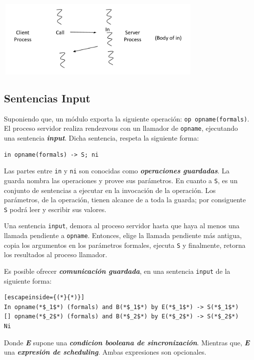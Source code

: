 \documentclass[a4paper, 10pt]{report}
\begin{document}
\centerline{
	\includegraphics[width=4in, height=1.5in]{assets/rendezvous_execution.png}
}

\subsection{Sentencias Input}

Suponiendo que, un módulo exporta la siguiente operación: \lstinline{op opname(formals)}. El proceso servidor realiza rendezvous con un llamador de \lstinline{opname}, ejecutando una sentencia \textbf{\emph{input}}. Dicha sentencia, respeta la siguiente forma:

\begin{lstlisting}
in opname(formals) -> S; ni
\end{lstlisting}

Las partes entre \lstinline{in} y \lstinline{ni} son conocidas como \textbf{\emph{operaciones guardadas}}. La guarda nombra las operaciones y provee sus parámetros.
En cuanto a \lstinline{S}, es un conjunto de sentencias a ejecutar en la invocación de la operación. Los parámetros, de la operación, tienen alcance de a toda la guarda; por consiguente \lstinline{S} podrá leer y escribir sus valores.

Una sentencia \lstinline{input}, demora al proceso servidor hasta que haya al menos una llamada pendiente a \lstinline{opname}. Entonces, elige la llamada pendiente más antigua, copia los argumentos en los parámetros formales, ejecuta \lstinline{S} y finalmente, retorna los resultados al proceso llamador.

Es posible ofrecer \textbf{\emph{comunicación guardada}}, en una sentencia \lstinline{input} de la siguiente forma:


\begin{lstlisting}[escapeinside={(*}{*)}]
In opname(*$_1$*) (formals) and B(*$_1$*) by E(*$_1$*) -> S(*$_1$*)
[] opname(*$_2$*) (formals) and B(*$_2$*) by E(*$_2$*) -> S(*$_2$*)
Ni
\end{lstlisting}

Donde \textbf{\emph{E}} supone una \textbf{\emph{condicion booleana de sincronización}}. Mientras que, \textbf{\emph{E}} una \textbf{\emph{expresión de scheduling}}. Ambas expresiones son opcionales.
\end{document}
